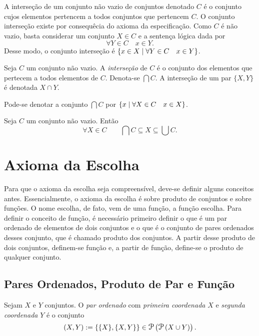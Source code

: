 A interseção de um conjunto não vazio de conjuntos denotado $C$ é o conjunto cujos elementos pertencem a todos conjuntos que pertencem $C$. O conjunto interseção existe por consequêcia do axioma da especificação. Como $C$ é não vazio, basta considerar um conjunto $X \in C$ e a sentença lógica dada por
	\begin{equation*}
	\forall Y \in C \quad x \in Y.
	\end{equation*}
Desse modo, o conjunto interseção é $\left\{x \in X \;\middle\vert\; \forall Y \in C \quad x \in Y \right\}$.

\begin{defi}
Seja $C$ um conjunto não vazio. A \emph{interseção} de $C$ é o conjunto dos elementos que pertecem a todos elementos de $C$. Denota-se $\bigcap C$. A interseção de um par $\{X,Y\}$ é denotada $X \cap Y$.
\end{defi}

Pode-se denotar a conjunto $\bigcap C$ por $\left\{x \;\middle\vert\; \forall X \in C \quad x \in X \right\}$.

\begin{prop}
Seja $C$ um conjunto não vazio. Então
	\begin{equation*}
	\forall X \in C \qquad \bigcap C \subseteq X \subseteq \bigcup C.
	\end{equation*}
\end{prop}

\section{Axioma da Escolha}

Para que o axioma da escolha seja compreensível, deve-se definir alguns conceitos antes. Essencialmente, o axioma da escolha é sobre produto de conjuntos e sobre funções. O nome escolha, de fato, vem de uma função, a função escolha. Para definir o conceito de função, é necessário primeiro definir o que é um par ordenado de elementos de dois conjuntos e o que é o conjunto de pares ordenados desses conjunto, que é chamado produto dos conjuntos. A partir desse produto de dois conjuntos, definem-se função e, a partir de função, define-se o produto de qualquer conjunto.

\subsection*{Pares Ordenados, Produto de Par e Função}

\begin{defi}
Sejam $X$ e $Y$ conjuntos. O \emph{par ordenado} com \emph{primeira coordenada} $X$ e \emph{segunda coordenada} $Y$ é o conjunto
	\begin{equation*}
	(X,Y) := \{\{X\},\{X,Y\}\} \in \p\left(\p\left(X \cup Y\right)\right).
	\end{equation*}
\end{defi}


